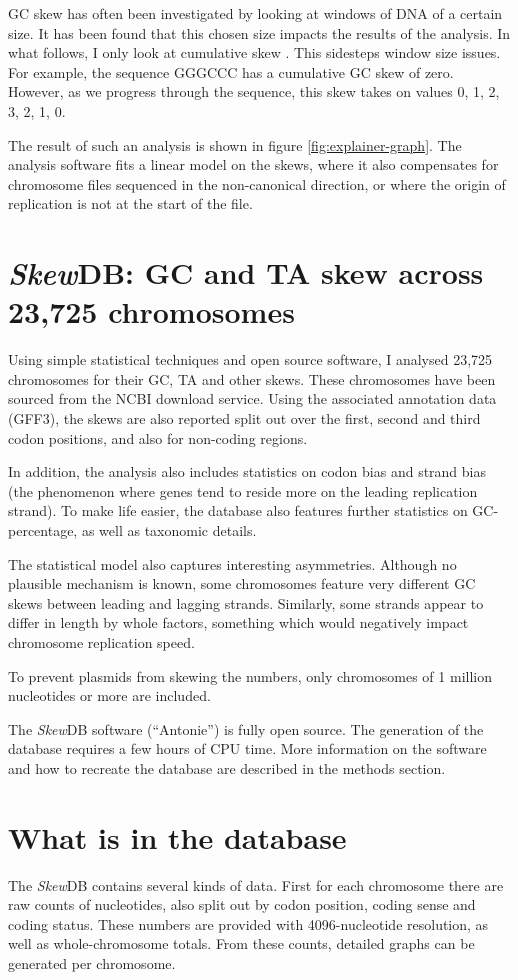 \documentclass[9pt,twocolumn,twoside]{pnas-new}
\begin{document}
GC skew has often been investigated by looking at windows of DNA of a certain size. It has been found that this chosen size impacts the results of the analysis. In what follows, I only look at cumulative skew \cite{grigoriev_analyzing_1998}. This sidesteps window size issues. For example, the sequence GGGCCC has a cumulative GC skew of zero. However, as we progress through the sequence, this skew takes on values 0, 1, 2, 3, 2, 1, 0.

The result of such an analysis is shown in figure \ref{fig:explainer-graph}. The analysis software fits a linear model on the skews, where it also compensates for chromosome files sequenced in the non-canonical direction, or where the origin of replication is not at the start of the file.

\section*{\emph{Skew}DB: GC and TA skew across 23,725 chromosomes}
Using simple statistical techniques and open source software, I analysed 23,725 chromosomes for their GC, TA and other skews.
These chromosomes have been sourced from the NCBI download service. Using the associated annotation data (GFF3), the skews are also reported split out over the first, second and third codon positions, and also for non-coding regions.

In addition, the analysis also includes statistics on codon bias and strand bias (the phenomenon where genes tend to reside more on the leading replication strand). To make life easier, the database also features further statistics on GC-percentage, as well as taxonomic details.

The statistical model also captures interesting asymmetries. Although no plausible mechanism is known, some chromosomes feature very different GC skews between leading and lagging strands. Similarly, some strands appear to differ in length by whole factors, something which would negatively impact chromosome replication speed.

To prevent plasmids from skewing the numbers, only chromosomes of 1 million nucleotides or more are included. 

The \emph{Skew}DB software (``Antonie'') is fully open source. The generation of the database requires a few hours of CPU time. More information on the software and how to recreate the database are described in the methods section.

\section*{What is in the database}
The \emph{Skew}DB contains several kinds of data. First for each chromosome there are raw counts of nucleotides, also split out by codon position, coding sense and coding status. These numbers are provided with 4096-nucleotide resolution, as well as whole-chromosome totals. From these counts, detailed graphs can be generated per chromosome.
\end{document}
